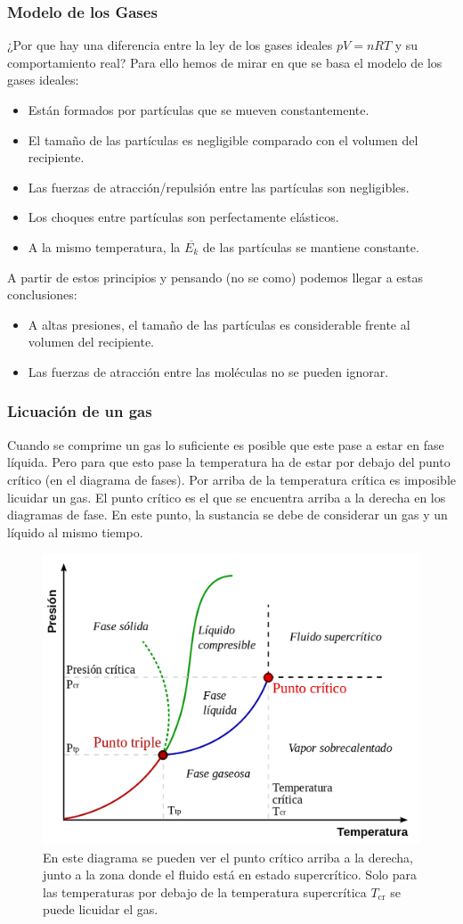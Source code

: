 \documentclass[arial,a4paper,print]{article}
\begin{document}
\subsubsection{Modelo de los Gases}

¿Por que hay una diferencia entre la ley de los gases ideales $pV = nRT$ y su comportamiento real?
Para ello hemos de mirar en que se basa el modelo de los gases ideales:
\begin{itemize}
\item Están formados por partículas que se mueven constantemente.
\item El tamaño de las partículas es negligible comparado con el volumen del recipiente. 
\item Las fuerzas de atracción/repulsión entre las partículas son negligibles. 
\item Los choques entre partículas son perfectamente elásticos. 
\item A la mismo temperatura, la $\overline{E_{k}}$ de las partículas se mantiene constante. 
\end{itemize}

A partir de estos principios y pensando (no se como) podemos llegar a estas conclusiones:
\begin{itemize}
\item A altas presiones, el tamaño de las partículas es considerable frente al volumen del recipiente. 
\item Las fuerzas de atracción entre las moléculas no se pueden ignorar.
\end{itemize}

\subsubsection{Licuación de un gas}
Cuando se comprime un gas lo suficiente es posible que este pase a estar en fase líquida. Pero para que esto pase la temperatura ha de estar por debajo del punto crítico (en el diagrama de fases). Por arriba de la temperatura crítica es imposible licuidar un gas. El punto crítico es el que se encuentra arriba a la derecha en los diagramas de fase. En este punto, la sustancia se debe de considerar un gas y un líquido al mismo tiempo.
\begin{figure}[H]
	\centering
	\includegraphics[width=0.5\linewidth]{figures/diagrama_fases}
	\caption{En este diagrama se pueden ver el punto crítico arriba a la derecha, junto a la zona donde el fluido está en estado supercrítico. Solo para las temperaturas por debajo de la temperatura supercrítica $T_{\text{cr}}$ se puede licuidar el gas. }
	\label{fig:diagramafases}
\end{figure}
\end{document}

